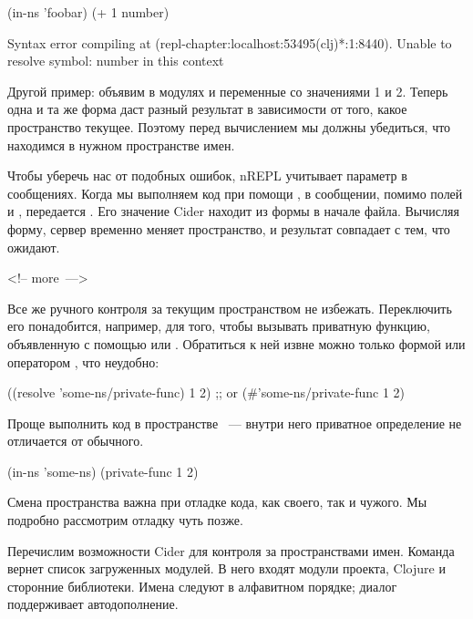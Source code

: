 \begin{english}
  \begin{clojure}
(in-ns 'foobar)
(+ 1 number)

Syntax error compiling at (repl-chapter:localhost:53495(clj)*:1:8440).
Unable to resolve symbol: number in this context
  \end{clojure}
\end{english}

Другой пример: объявим в модулях  и  переменные  со значениями 1 и 2. Теперь одна и та же форма  даст разный результат в зависимости от того, какое пространство текущее. Поэтому перед вычислением мы должны убедиться, что находимся в нужном пространстве имен.

Чтобы уберечь нас от подобных ошибок, nREPL учитывает параметр  в сообщениях. Когда мы выполняем код при помощи , в сообщении, помимо полей  и , передается . Его значение Cider находит из формы  в начале файла. Вычисляя форму, сервер временно меняет пространство, и результат совпадает с тем, что ожидают.

<!-- more~--->

Все же ручного контроля за текущим пространством не избежать. Переключить его понадобится, например, для того, чтобы вызывать приватную функцию, объявленную с помощью  или . Обратиться к ней извне можно только формой  или оператором , что неудобно:

\begin{english}
  \begin{clojure}
((resolve 'some-ns/private-func) 1 2)
;; or
(#'some-ns/private-func 1 2)
  \end{clojure}
\end{english}

Проще выполнить код в пространстве ~--- внутри него приватное определение не отличается от обычного.

\begin{english}
  \begin{clojure}
(in-ns 'some-ns)
(private-func 1 2)
  \end{clojure}
\end{english}

Смена пространства важна при отладке кода, как своего, так и чужого. Мы подробно рассмотрим отладку чуть позже.

Перечислим возможности Cider для контроля за пространствами имен. Команда  вернет список загруженных модулей. В него входят модули проекта, Clojure и сторонние библиотеки. Имена следуют в алфавитном порядке; диалог поддерживает автодополнение.

